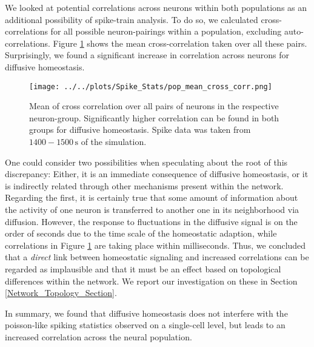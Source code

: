 \documentclass[10pt,a4paper]{article}
\begin{document}
We looked at potential correlations across neurons within both populations as an additional possibility of spike-train analysis. To do so, we calculated cross-correlations for all possible neuron-pairings within a population, excluding auto-correlations. Figure \ref{Pop_Mean_Cross_Corr} shows the mean cross-correlation taken over all these pairs. Surprisingly, we found a significant increase in correlation across neurons for diffusive homeostasis. 
\begin{figure}
\texttt{[image: ../../plots/Spike\_Stats/pop\_mean\_cross\_corr.png]}
\caption{Mean of cross correlation over all pairs of neurons in the respective neuron-group. Significantly higher correlation can be found in both groups for diffusive homeostasis. Spike data was taken from $\mathrm{1400-1500\,s}$ of the simulation.}
\label{Pop_Mean_Cross_Corr}
\end{figure}
One could consider two possibilities when speculating about the root of this discrepancy: Either, it is an immediate consequence of diffusive homeostasis, or it is indirectly related through other mechanisms present within the network. Regarding the first, it is certainly true that some amount of information about the activity of one neuron is transferred to another one in its neighborhood via diffusion. However, the response to fluctuations in the diffusive signal is on the order of seconds due to the time scale of the homeostatic adaption, while correlations in Figure \ref{Pop_Mean_Cross_Corr} are taking place within milliseconds. Thus, we concluded that a \emph{direct} link between homeostatic signaling and increased correlations can be regarded as implausible and that it must be an effect based on topological differences within the network. We report our investigation on these in Section \ref{Network_Topology_Section}.

In summary, we found that diffusive homeostasis does not interfere with the poisson-like spiking statistics observed on a single-cell level, but leads to an increased correlation across the neural population. 
\end{document}
